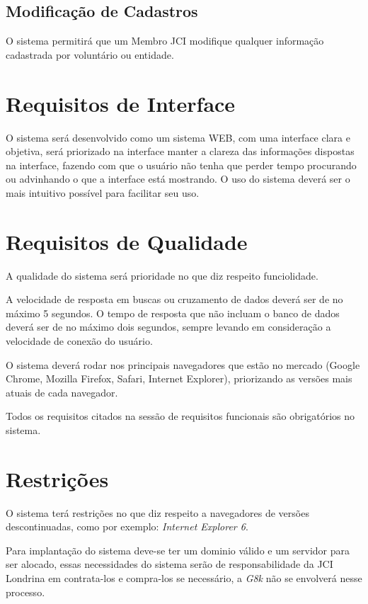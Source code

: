     \subsection{Modificação de Cadastros}
    O sistema permitirá que um Membro JCI modifique qualquer informação cadastrada por voluntário ou entidade.

  \section{Requisitos de Interface}
  O sistema será desenvolvido como um sistema WEB, com uma interface clara e objetiva, será priorizado na interface manter a clareza das informações dispostas na 
  interface, fazendo com que o usuário não tenha que perder tempo procurando ou advinhando o que a interface está mostrando. O uso do sistema deverá ser o mais 
  intuitivo possível para facilitar seu uso.
  
  \section{Requisitos de Qualidade}
  A qualidade do sistema será prioridade no que diz respeito funciolidade.

  A velocidade de resposta em buscas ou cruzamento de dados deverá ser de no máximo 5 segundos. O tempo de resposta que não incluam o banco de dados deverá ser de 
  no máximo dois segundos, sempre levando em consideração a velocidade de conexão do usuário.

  O sistema deverá rodar nos principais navegadores que estão no mercado (Google Chrome, Mozilla Firefox, Safari, Internet Explorer), priorizando as versões 
  mais atuais de cada navegador.

  Todos os requisitos citados na sessão de requisitos funcionais são obrigatórios no sistema.

  \section{Restrições}
  O sistema terá restrições no que diz respeito a navegadores de versões descontinuadas, como por exemplo: \textit{Internet Explorer 6}.

  Para implantação do sistema deve-se ter um dominio válido e um servidor para ser alocado, essas necessidades do sistema serão de responsabilidade da JCI Londrina em contrata-los e compra-los se necessário, a \textit{G8k} não se envolverá nesse processo. 
